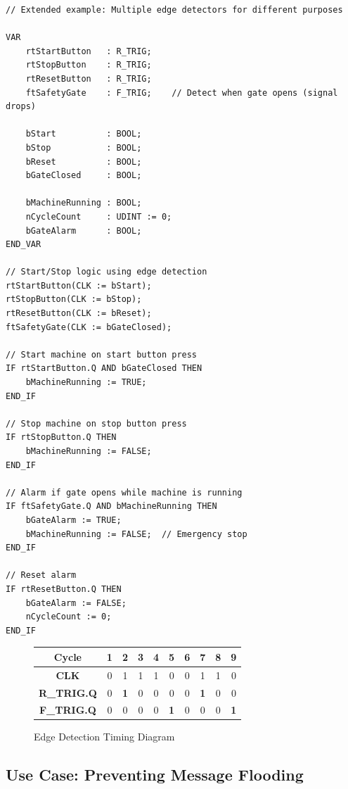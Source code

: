 \documentclass[11pt,a4paper]{article}
\begin{document}
\begin{lstlisting}
// Extended example: Multiple edge detectors for different purposes

VAR
    rtStartButton   : R_TRIG;
    rtStopButton    : R_TRIG;
    rtResetButton   : R_TRIG;
    ftSafetyGate    : F_TRIG;    // Detect when gate opens (signal drops)
    
    bStart          : BOOL;
    bStop           : BOOL;
    bReset          : BOOL;
    bGateClosed     : BOOL;
    
    bMachineRunning : BOOL;
    nCycleCount     : UDINT := 0;
    bGateAlarm      : BOOL;
END_VAR

// Start/Stop logic using edge detection
rtStartButton(CLK := bStart);
rtStopButton(CLK := bStop);
rtResetButton(CLK := bReset);
ftSafetyGate(CLK := bGateClosed);

// Start machine on start button press
IF rtStartButton.Q AND bGateClosed THEN
    bMachineRunning := TRUE;
END_IF

// Stop machine on stop button press
IF rtStopButton.Q THEN
    bMachineRunning := FALSE;
END_IF

// Alarm if gate opens while machine is running
IF ftSafetyGate.Q AND bMachineRunning THEN
    bGateAlarm := TRUE;
    bMachineRunning := FALSE;  // Emergency stop
END_IF

// Reset alarm
IF rtResetButton.Q THEN
    bGateAlarm := FALSE;
    nCycleCount := 0;
END_IF
\end{lstlisting}

\begin{figure}[h]
\centering
\begin{tabular}{|c|c|c|c|c|c|c|c|c|c|}
\hline
\textbf{Cycle} & 1 & 2 & 3 & 4 & 5 & 6 & 7 & 8 & 9 \\
\hline
\textbf{CLK} & 0 & 1 & 1 & 1 & 0 & 0 & 1 & 1 & 0 \\
\hline
\textbf{R\_TRIG.Q} & 0 & \textbf{1} & 0 & 0 & 0 & 0 & \textbf{1} & 0 & 0 \\
\hline
\textbf{F\_TRIG.Q} & 0 & 0 & 0 & 0 & \textbf{1} & 0 & 0 & 0 & \textbf{1} \\
\hline
\end{tabular}
\caption{Edge Detection Timing Diagram}
\end{figure}

\subsection{Use Case: Preventing Message Flooding}
\end{document}
